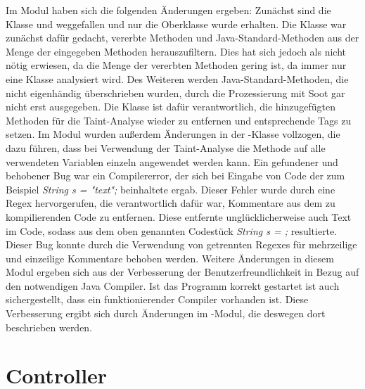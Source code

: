 Im Modul  haben sich die folgenden Änderungen ergeben: \newline
Zunächst sind die Klasse  und  weggefallen und nur die Oberklasse  wurde erhalten. Die Klasse  war zunächst dafür gedacht, vererbte Methoden und Java-Standard-Methoden aus der Menge der eingegeben Methoden herauszufiltern. Dies hat sich jedoch als nicht nötig erwiesen, da die Menge der vererbten Methoden gering ist, da immer nur eine Klasse analysiert wird. Des Weiteren werden Java-Standard-Methoden, die nicht eigenhändig überschrieben wurden, durch die Prozessierung mit Soot gar nicht erst ausgegeben. Die Klasse  ist dafür verantwortlich, die hinzugefügten Methoden für die Taint-Analyse wieder zu entfernen und entsprechende Tags zu setzen. \newline
Im Modul  wurden außerdem Änderungen in der -Klasse vollzogen, die dazu führen, dass bei Verwendung der Taint-Analyse die Methode  auf alle verwendeten Variablen einzeln angewendet werden kann.\newline
Ein gefundener und behobener Bug war ein Compilererror, der sich bei Eingabe von Code der zum Beispiel \textit{String s = "text";} beinhaltete ergab. Dieser Fehler wurde durch eine Regex hervorgerufen, die verantwortlich dafür war, Kommentare aus dem zu kompilierenden Code zu entfernen. Diese entfernte unglücklicherweise auch Text im Code, sodass aus dem oben genannten Codestück \textit{String s = ;} resultierte. Dieser Bug konnte durch die Verwendung von getrennten Regexes für mehrzeilige und einzeilige Kommentare behoben werden.\newline
Weitere Änderungen in diesem Modul ergeben sich aus der Verbesserung der Benutzerfreundlichkeit in Bezug auf den notwendigen Java Compiler. Ist das Programm korrekt gestartet ist auch sichergestellt, dass ein funktionierender Compiler vorhanden ist. Diese Verbesserung ergibt sich durch Änderungen im -Modul, die deswegen dort beschrieben werden.\newline

\section{Controller}

